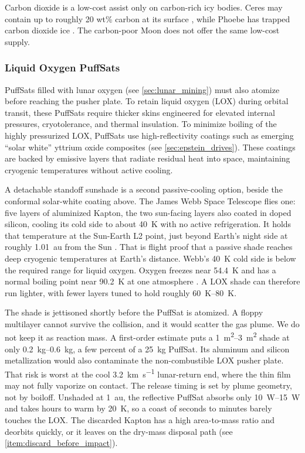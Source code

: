 \documentclass{article}
\begin{document}
Carbon dioxide is a low-cost assist only on carbon-rich icy bodies. Ceres may contain up to roughly 20 wt\% carbon at its surface \cite{marchi2019_ceres_carbon}, while Phoebe has trapped carbon dioxide ice \cite{phoebe}. The carbon-poor Moon does not offer the same low-cost supply.

\subsubsection{Liquid Oxygen PuffSats}\label{sec:lox_puffsat}
PuffSats filled with lunar oxygen (see \autoref{sec:lunar_mining}) must also atomize before reaching the pusher plate. To retain liquid oxygen (LOX) during orbital transit, these PuffSats require thicker skins engineered for elevated internal pressures, cryotolerance, and thermal insulation. To minimize boiling of the highly pressurized LOX, PuffSats use high-reflectivity coatings such as emerging ``solar white'' yttrium oxide composites \cite{nasa_solar_white_y2o3} (see \autoref{sec:epstein_drives}).  These coatings are backed by emissive layers that radiate residual heat into space, maintaining cryogenic temperatures without active cooling.

A detachable standoff sunshade is a second passive-cooling option, beside the conformal solar-white coating above. The James Webb Space Telescope flies one: five layers of aluminized Kapton, the two sun-facing layers also coated in doped silicon, cooling its cold side to about \SI{40}{\kelvin} with no active refrigeration. It holds that temperature at the Sun-Earth L2 point, just beyond Earth's night side at roughly \SI{1.01}{\astronomicalunit} from the Sun \cite{jwst_sunshield, gardner2023jwst_mission}. That is flight proof that a passive shade reaches deep cryogenic temperatures at Earth's distance. Webb's \SI{40}{\kelvin} cold side is below the required range for liquid oxygen. Oxygen freezes near \SI{54.4}{\kelvin} and has a normal boiling point near \SI{90.2}{\kelvin} at one atmosphere \cite{nist_webbook_oxygen}. A LOX shade can therefore run lighter, with fewer layers tuned to hold roughly \SIrange{60}{80}{\kelvin}.

The shade is jettisoned shortly before the PuffSat is atomized. A floppy multilayer cannot survive the collision, and it would scatter the gas plume. We do not keep it as reaction mass. A first-order estimate puts a \SIrange{1}{3}{\square\meter} shade at only \SIrange{0.2}{0.6}{\kilo\gram}, a few percent of a \SI{25}{\kilo\gram} PuffSat. Its aluminum and silicon metallization would also contaminate the non-combustible LOX pusher plate. That risk is worst at the cool \SI{3.2}{\kilo\meter\per\second} lunar-return end, where the thin film may not fully vaporize on contact. The release timing is set by plume geometry, not by boiloff. Unshaded at \SI{1}{\astronomicalunit}, the reflective PuffSat absorbs only \SIrange{10}{15}{\watt} and takes hours to warm by \SI{20}{\kelvin}, so a coast of seconds to minutes barely touches the LOX. The discarded Kapton has a high area-to-mass ratio and deorbits quickly, or it leaves on the dry-mass disposal path (see \autoref{item:discard_before_impact}).
\end{document}
